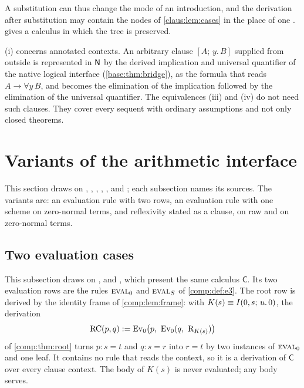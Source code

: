 A substitution can thus change the mode of an introduction, and the
derivation after substitution may contain the nodes of
\cref{claus:lem:cases} in the place of one .
 gives a calculus in which the tree is preserved.

\begin{remark}
\label{claus:rem:external}
(i) concerns annotated contexts. An arbitrary clause
$[A;\,y.\,B]$ supplied from outside is represented in $\mathsf{N}$ by the derived
implication and universal quantifier of the native logical interface
(\cref{base:thm:bridge}), as the formula that reads $A\to\forall y\,B$, and
 becomes the elimination of the implication followed by the
elimination of the universal quantifier. The equivalences (iii) and (iv)
do not need such clauses. They cover every sequent with ordinary
assumptions and not only closed theorems.
\end{remark}

\section{Variants of the arithmetic interface}
\label{claus:sec:arith}

This section draws on ,
, ,
, ,
 and ; each subsection names
its sources. The variants are: an evaluation rule with two rows, an
evaluation rule with one scheme on zero-normal terms, and reflexivity
stated as a clause, on raw and on zero-normal terms.

\subsection{Two evaluation cases}
\label{claus:sec:twocase}

This subsection draws on ,
 and , which present
the same calculus $\mathsf{C}$. Its two evaluation rows are the rules
$\rulename{Eval}_0$ and $\rulename{Eval}_{\Suc}$ of \cref{comp:def:e3}. The
root row is derived by the identity frame of \cref{comp:lem:frame}: with
$K(s)\equiv I(0,s;\,u.\,0)$, the derivation
\[
 \mathrm{RC}(p,q)\defeq
 \mathrm{Ev}_0\bigl(p,\ \mathrm{Ev}_0(q,\ \mathrm{R}_{K(s)})\bigr)
\]
of \cref{comp:thm:root} turns $p:s=t$ and $q:s=r$ into $r=t$ by two
instances of $\rulename{Eval}_0$ and one  leaf. It contains
no rule that reads the context, so it is a derivation of $\mathsf{C}$ over
every clause context. The body of $K(s)$ is never evaluated; any body
serves.

